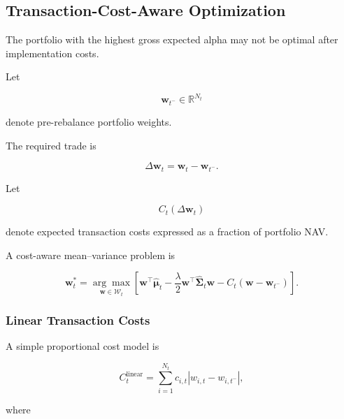 \documentclass[11pt,a4paper]{article}
\begin{document}
\subsection{Transaction-Cost-Aware Optimization}
\label{subsec:transaction_cost_aware_optimization}

The portfolio with the highest gross expected alpha may not be optimal after
implementation costs.

Let

\begin{equation}
\mathbf{w}_{t^-}
\in
\mathbb{R}^{N_t}
\end{equation}

denote pre-rebalance portfolio weights.

The required trade is

\begin{equation}
\boxed{
\Delta\mathbf{w}_t
=
\mathbf{w}_t
-
\mathbf{w}_{t^-}.
}
\end{equation}

Let

\begin{equation}
C_t
\left(
\Delta\mathbf{w}_t
\right)
\end{equation}

denote expected transaction costs expressed as a fraction of portfolio NAV.

A cost-aware mean--variance problem is

\begin{equation}
\boxed{
\mathbf{w}_t^{*}
=
\underset{\mathbf{w}\in\mathcal{W}_t}{\arg\max}
\left[
\mathbf{w}^{\top}
\widehat{\boldsymbol{\mu}}_t
-
\frac{\lambda}{2}
\mathbf{w}^{\top}
\widehat{\boldsymbol{\Sigma}}_t
\mathbf{w}
-
C_t
\left(
\mathbf{w}
-
\mathbf{w}_{t^-}
\right)
\right].
}
\end{equation}


\subsubsection{Linear Transaction Costs}

A simple proportional cost model is

\begin{equation}
\boxed{
C_t^{\mathrm{linear}}
=
\sum_{i=1}^{N_t}
c_{i,t}
\left|
w_{i,t}
-
w_{i,t^-}
\right|,
}
\end{equation}

where
\end{document}
